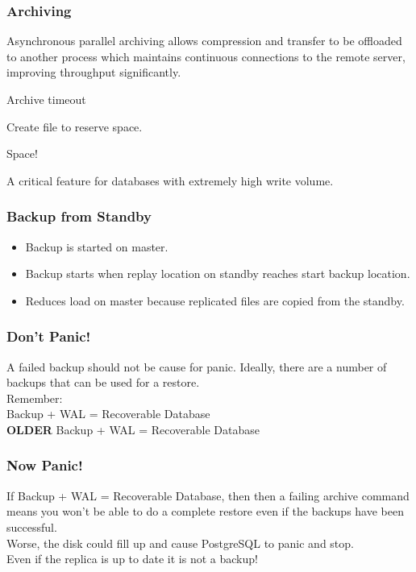 \begin{frame}
    \frametitle{Archiving}

    Asynchronous parallel archiving allows compression and transfer to be offloaded to another process which maintains continuous connections to the remote server, improving throughput significantly.\\\pause
    \vspace{1em}

    Archive timeout

    Create file to reserve space.

    Space!

    A critical feature for databases with extremely high write volume.
\end{frame}

\begin{frame}
    \frametitle{Backup from Standby}

    \begin{itemize}
        \item Backup is started on master.\pause
        \item Backup starts when replay location on standby reaches start backup location.\pause
        \item Reduces load on master because replicated files are copied from the standby.
    \end{itemize}
\end{frame}

\begin{frame}
    \frametitle{Don't Panic!}

    A failed backup should not be cause for panic.  Ideally, there are a number of backups that can be used for a restore.\\
    \vspace{1em}
    Remember:\\
    \vspace{1em}
    Backup + WAL = Recoverable Database\\
    \textbf{OLDER} Backup + WAL = Recoverable Database
\end{frame}

\begin{frame}
    \frametitle{Now Panic!}

    If Backup + WAL = Recoverable Database, then then a failing archive command means you won't be able to do a complete restore even if the backups have been successful.\\
    \vspace{1em}
    Worse, the disk could fill up and cause PostgreSQL to panic and stop.\\
    \vspace{1em}
    Even if the replica is up to date it is not a backup!
\end{frame}

